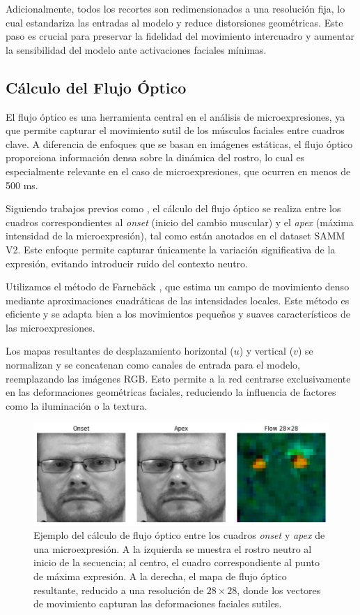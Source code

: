 \documentclass[conference]{IEEEtran}
\begin{document}
Adicionalmente, todos los recortes son redimensionados a una resolución fija, lo cual estandariza las entradas al modelo y reduce distorsiones geométricas. Este paso es crucial para preservar la fidelidad del movimiento intercuadro y aumentar la sensibilidad del modelo ante activaciones faciales mínimas.

\subsection{Cálculo del Flujo Óptico}

El flujo óptico es una herramienta central en el análisis de microexpresiones, ya que permite capturar el movimiento sutil de los músculos faciales entre cuadros clave. A diferencia de enfoques que se basan en imágenes estáticas, el flujo óptico proporciona información densa sobre la dinámica del rostro, lo cual es especialmente relevante en el caso de microexpresiones, que ocurren en menos de 500 ms.

Siguiendo trabajos previos como \cite{zhang2023htnet}, el cálculo del flujo óptico se realiza entre los cuadros correspondientes al \textit{onset} (inicio del cambio muscular) y el \textit{apex} (máxima intensidad de la microexpresión), tal como están anotados en el dataset SAMM V2. Este enfoque permite capturar únicamente la variación significativa de la expresión, evitando introducir ruido del contexto neutro.

Utilizamos el método de Farnebäck \cite{farneback2003two}, que estima un campo de movimiento denso mediante aproximaciones cuadráticas de las intensidades locales. Este método es eficiente y se adapta bien a los movimientos pequeños y suaves característicos de las microexpresiones.

Los mapas resultantes de desplazamiento horizontal ($u$) y vertical ($v$) se normalizan y se concatenan como canales de entrada para el modelo, reemplazando las imágenes RGB. Esto permite a la red centrarse exclusivamente en las deformaciones geométricas faciales, reduciendo la influencia de factores como la iluminación o la textura.

\begin{figure}[h]
\centering
\includegraphics[width=\linewidth]{figs/optical_flow_sample.png}
\caption{Ejemplo del cálculo de flujo óptico entre los cuadros \textit{onset} y \textit{apex} de una microexpresión. A la izquierda se muestra el rostro neutro al inicio de la secuencia; al centro, el cuadro correspondiente al punto de máxima expresión. A la derecha, el mapa de flujo óptico resultante, reducido a una resolución de $28 \times 28$, donde los vectores de movimiento capturan las deformaciones faciales sutiles.}
\label{fig:flow_example}
\end{figure}
\end{document}
